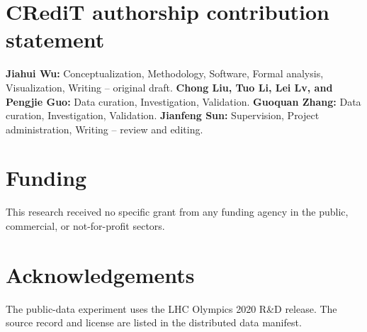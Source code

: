 \documentclass[preprint,12pt]{elsarticle}
\begin{document}
\section*{CRediT authorship contribution statement}
\textbf{Jiahui Wu:} Conceptualization, Methodology, Software, Formal analysis,
Visualization, Writing -- original draft.  \textbf{Chong Liu, Tuo Li, Lei Lv,
and Pengjie Guo:} Data curation, Investigation, Validation.  \textbf{Guoquan
Zhang:} Data curation, Investigation, Validation.  \textbf{Jianfeng Sun:}
Supervision, Project administration, Writing -- review and editing.

\section*{Funding}
This research received no specific grant from any funding agency in the
public, commercial, or not-for-profit sectors.

\section*{Acknowledgements}
The public-data experiment uses the LHC Olympics 2020 R\&D release.  The source
record and license are listed in the distributed data manifest.



\end{document}
